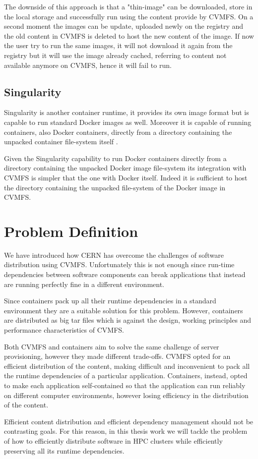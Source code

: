 The downside of this approach is that a "thin-image" can be downloaded, store in
the local storage and successfully run using the content provide by CVMFS. On a
second moment the images can be update, uploaded newly on the registry and the
old content in CVMFS is deleted to host the new content of the image. If now
the user try to run the same images, it will not download it again from the
registry but it will use the image already cached, referring
to content not available anymore on CVMFS, hence it will fail to run.

\subsection{Singularity}\label{subsec:singularity}

Singularity \citep{singularity:home} is another container runtime, it provides
its own image format but is capable to run standard Docker images
\cite{singularity:docker} as well.  Moreover it is capable of running
containers, also Docker containers, directly from a directory containing the
unpacked container file-system itself \cite{singularity:run}.

Given the Singularity capability to run Docker containers directly from a
directory containing the unpacked Docker image file-system its integration with
CVMFS is simpler that the one with Docker itself. Indeed it is sufficient to
host the directory containing the unpacked file-system of the Docker image in
CVMFS.

\section{Problem Definition}\label{sec:problem}

We have introduced how CERN has overcome the challenges of software distribution
using CVMFS. Unfortunately this is not enough since run-time dependencies
between software components can break applications that instead are running
perfectly fine in a different environment.

Since containers pack up all their runtime dependencies in a standard
environment they are a suitable solution for this problem. However, containers
are distributed as big tar files which is against the design, working
principles and performance characteristics of CVMFS.

Both CVMFS and containers aim to solve the same challenge of server
provisioning, however they made different trade-offs. CVMFS opted for an
efficient distribution of the content, making difficult and
inconvenient to pack all the runtime dependencies of a particular application.
Containers, instead, opted to make each application self-contained so that the
application can run reliably on different computer environments, however
losing efficiency in the distribution of the content.

Efficient content distribution and efficient dependency management should not
be contrasting goals. For this reason, in this thesis work we will tackle the
problem of how to efficiently distribute software in HPC clusters while
efficiently preserving all its runtime dependencies.


